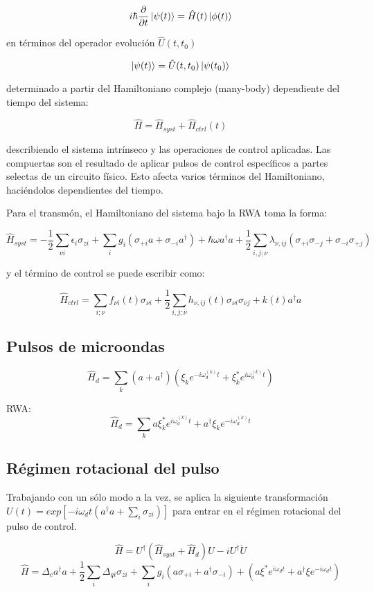 \[
i \hbar \frac{\partial}{\partial t} \ket{\psi(t)} = \hat{H}(t) \ket{\phi(t)}
\]

en términos del operador evolución $\hat{U}(t,t_0)$

\[
\ket{\psi(t)} = \hat{U}(t,t_0) \ket{\psi(t_0)}
\]

determinado a partir del Hamiltoniano complejo (many-body) dependiente del tiempo del sistema:

\[
\hat{H} = \hat{H}_{syst} + \hat{H}_{ctrl}(t)
\]

describiendo el sistema intrínseco y las operaciones de control aplicadas. Las compuertas son el resultado de aplicar pulsos de control específicos a partes selectas de un circuito físico. Esto afecta varios términos del Hamiltoniano, haciéndolos dependientes del tiempo.

Para el transmón, el Hamiltoniano del sistema bajo la RWA toma la forma:

\[
\hat{H}_{syst} = -\frac{1}{2} \sum\limits_{\nu i} \epsilon_i \sigma_{z i} + \sum\limits_{i} g_i (\sigma_{+ i} a + \sigma_{- i} a^\dag) + \hbar \omega a^\dag a + \frac{1}{2} \sum\limits_{i,j;\nu} \lambda_{\nu, ij} (\sigma_{+ i} \sigma_{- j} + \sigma_{- i} \sigma_{+ j})
\]

y el término de control se puede escribir como:

\[
\hat{H}_{ctrl} = \sum\limits_{i; \nu} f_{\nu i}(t) \sigma_{\nu i} + \frac{1}{2} \sum\limits_{i,j;\nu} h_{\nu, ij}(t) \sigma_{\nu i} \sigma_{\nu j} + k(t) a^\dag a
\]

\subsection{Pulsos de microondas}

$$\hat{H}_d = \sum\limits_k (a+a^\dagger) (\xi_k e^{-i\omega_d^{(k)}t} + \xi_k^*e^{i\omega_d^{(k)}t})$$

RWA: $$\hat{H}_d=\sum\limits_k a\xi_k^*e^{i\omega_d^{(k)}t}+ a^\dagger\xi_ke^{-i\omega_d^{(k)}t}$$

\subsection{Régimen rotacional del pulso}

Trabajando con un sólo modo a la vez, se aplica la siguiente transformación $U(t) = exp[-i \omega_d t(a^\dagger a + \sum\limits_i \sigma_{z i})]$ para entrar en el régimen rotacional del pulso de control.

$$\hat{H} = U^\dagger (\hat{H}_{syst} + \hat{H}_d) U - i U^\dagger \dot{U}$$
$$ \hat{H} = \Delta_c a^\dagger a + \frac{1}{2} \sum\limits_i \Delta_{qi} \sigma_{zi} + \sum\limits_i g_i (a \sigma_{+ i} + a^\dagger \sigma_{- i}) + (a\xi^*e^{i\omega_d t}+a^\dagger\xi e^{-i\omega_d t})$$

